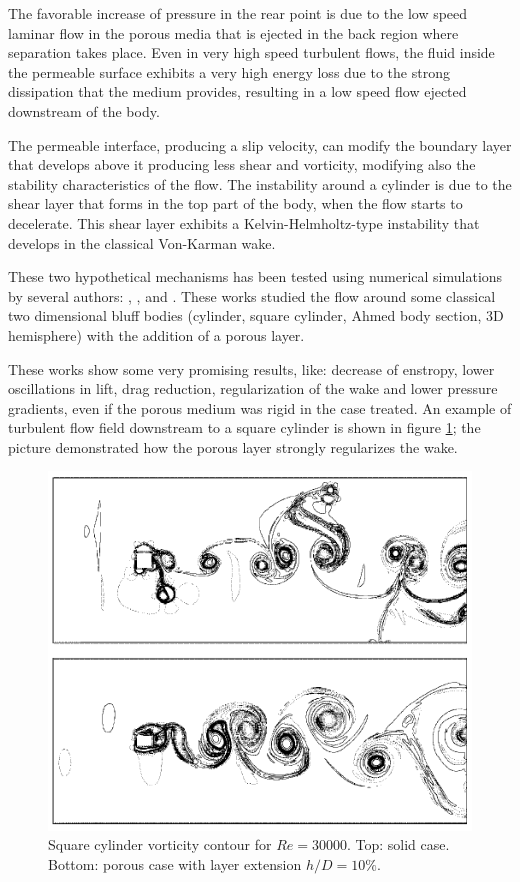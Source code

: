 The favorable increase of pressure in the rear point is due to the low speed laminar flow in the porous media that is ejected in the back region where separation takes place.
Even in very high speed turbulent flows, the fluid inside the permeable surface exhibits a very high energy loss due to the strong dissipation that the medium provides, resulting in a low speed flow ejected downstream of the body.

The permeable interface, producing a slip velocity, can modify the boundary layer that develops above it producing less shear and vorticity, modifying also the stability characteristics of the flow.
The instability around a cylinder is due to the shear layer that forms in the top part of the body, when the flow starts to decelerate.
This shear layer exhibits a Kelvin-Helmholtz-type instability that develops in the classical Von-Karman wake.

These two hypothetical mechanisms has been tested using numerical simulations by several authors: \citet{bruneau2004passive} \cite{bruneau2008numerical}, \citet{bhattacharyya2011reduction}, \citet{naito2012numerical} and \citet{mimeau2017passive}.
These works studied the flow around some classical two dimensional bluff bodies (cylinder, square cylinder, Ahmed body section, 3D hemisphere) with the addition of a porous layer.

These works show some very promising results, like: decrease of enstropy, lower oscillations in lift, drag reduction, regularization of the wake and lower pressure gradients, even if the porous medium was rigid in the case treated.
An example of turbulent flow field downstream to a square cylinder is shown in figure \ref{fig:porous_cylinder}; the picture demonstrated how the porous layer strongly regularizes the wake.

\begin{figure}[h]
	\centering
	\includegraphics[width=0.7\linewidth]{chapter_1/cylinder_porous}
	\caption{Square cylinder vorticity contour for $Re=30000$. Top: solid case. Bottom: porous case with layer extension $h/D=10\%$.}
	\label{fig:porous_cylinder}
\end{figure}


